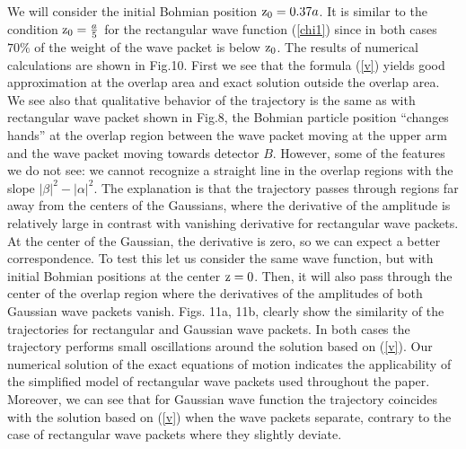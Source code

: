\documentclass[12pt,preprint,tightenlines]{elsarticle}
\begin{document}
\vspace{-10pt}
 We will consider the initial Bohmian position ${\rm z}_{0}=0.37a$.
It is similar to the condition ${\rm z}_{0}=\frac{a}{5}$ for the
rectangular wave function (\ref{chi1}) since in both cases $70\%$
of the weight of the wave packet is below ${\rm z}_{0}$. The results
of numerical calculations are shown in Fig.10. First we see that the formula (\ref{v}) yields good approximation at the overlap area and exact solution outside the overlap area.
We see also that qualitative
behavior of the trajectory is the same as with rectangular wave packet
shown in Fig.8, the Bohmian particle position ``changes hands''
at the overlap region between the wave packet moving at the upper arm and the wave packet moving towards detector $B$. However,
some of the features we do not see: we cannot recognize a straight
line in the overlap regions with the slope $|\beta|^{2}-|\alpha|^{2}$.
The explanation is that  the trajectory passes through regions
far away from the centers of the Gaussians, where the derivative of
the amplitude is relatively large in contrast with vanishing derivative for  rectangular wave packets. At the center of the Gaussian,
the derivative is zero, so we can expect a better correspondence.
To test this let us consider the same wave function, but with initial
 Bohmian positions at the center ${\rm z}=0$. Then, it
will also pass through the center of the overlap region where the
derivatives of the amplitudes of both Gaussian wave packets vanish.
Figs. 11a, 11b, clearly show the similarity of the trajectories for rectangular
and Gaussian wave packets.  In both cases the trajectory performs small oscillations
around the solution based on (\ref{v}). Our numerical solution of the exact equations of motion
indicates the applicability  of the simplified model of rectangular wave
packets used throughout the paper. Moreover, we can see that for Gaussian wave function the  trajectory
coincides with the solution based on (\ref{v}) when  the wave packets separate, contrary to the case of  rectangular wave
packets where they  slightly deviate.
\end{document}
